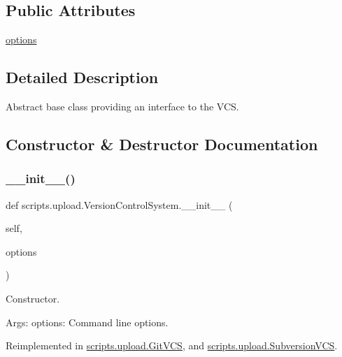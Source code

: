 \subsection*{Public Attributes}
\begin{DoxyCompactItemize}
\item 
\mbox{\hyperlink{classscripts_1_1upload_1_1_version_control_system_a090853e1034cd5dfe4fd0118201e5af1}{options}}
\end{DoxyCompactItemize}


\subsection{Detailed Description}
\begin{DoxyVerb}Abstract base class providing an interface to the VCS.\end{DoxyVerb}
 

\subsection{Constructor \& Destructor Documentation}
\mbox{\label{classscripts_1_1upload_1_1_version_control_system_af9abfef93ba0921f6c63b51309c8d711}} 
\subsubsection{\texorpdfstring{\_\_init\_\_()}{\_\_init\_\_()}}
{\footnotesize\ttfamily def scripts.\+upload.\+Version\+Control\+System.\+\_\+\+\_\+init\+\_\+\+\_\+ (\begin{DoxyParamCaption}\item[{}]{self,  }\item[{}]{options }\end{DoxyParamCaption})}

\begin{DoxyVerb}Constructor.

Args:
  options: Command line options.
\end{DoxyVerb}
 

Reimplemented in \mbox{\hyperlink{classscripts_1_1upload_1_1_git_v_c_s_a79253ecc9f86353a766adc8c8c959f29}{scripts.\+upload.\+Git\+V\+CS}}, and \mbox{\hyperlink{classscripts_1_1upload_1_1_subversion_v_c_s_a5180e2cfa533732369e497a81f437e8e}{scripts.\+upload.\+Subversion\+V\+CS}}.



